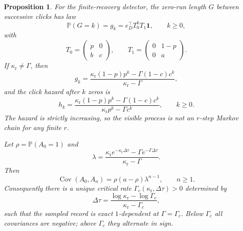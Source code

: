 \documentclass[11pt]{article}
\newtheorem{proposition}[theorem]{Proposition}
\theoremstyle{definition}
\newcommand{\PP}{\mathbb{P}}
\begin{document}
\begin{proposition}\label{prop:recovery-main}
For the finite-recovery detector, the zero-run length $G$ between successive clicks has law
\begin{equation}\label{eq:gap-main}
\PP(G=k)=g_k=e_D^{\top}T_0^kT_1\mathbf 1,
\qquad k\ge0,
\end{equation}
with
\begin{equation}\label{eq:t0-t1-main}
T_0=
\begin{pmatrix}
 p & 0 \\
 b & c
\end{pmatrix},
\qquad
T_1=
\begin{pmatrix}
 0 & 1-p \\
 0 & a
\end{pmatrix}.
\end{equation}
If $\kappa_{\mathrm r}\neq\Gamma$, then
\begin{equation}\label{eq:gap-closed-main}
g_k=
\frac{\kappa_{\mathrm r}(1-p)p^k-\Gamma(1-c)c^k}{\kappa_{\mathrm r}-\Gamma},
\end{equation}
and the click hazard after $k$ zeros is
\begin{equation}\label{eq:hazard-main}
h_k=
\frac{\kappa_{\mathrm r}(1-p)p^k-\Gamma(1-c)c^k}
     {\kappa_{\mathrm r}p^k-\Gamma c^k},
\qquad k\ge0.
\end{equation}
The hazard is strictly increasing, so the visible process is not an $r$-step Markov chain for any finite $r$.

Let $\rho=\PP(A_0=1)$ and
\begin{equation}\label{eq:lambda-main}
\lambda=
\frac{\kappa_{\mathrm r}e^{-\kappa_{\mathrm r}\Delta\tau}-\Gamma e^{-\Gamma\Delta\tau}}
{\kappa_{\mathrm r}-\Gamma}.
\end{equation}
Then
\begin{equation}\label{eq:cov-main}
\operatorname{Cov}(A_0,A_n)=\rho(a-\rho)\lambda^{n-1},\qquad n\ge1.
\end{equation}
Consequently there is a unique critical rate $\Gamma_c(\kappa_{\mathrm r},\Delta\tau)>0$ determined by
\begin{equation}\label{eq:gamma-c-main}
\Delta\tau=
\frac{\log\kappa_{\mathrm r}-\log\Gamma_c}{\kappa_{\mathrm r}-\Gamma_c},
\end{equation}
such that the sampled record is exact $1$-dependent at $\Gamma=\Gamma_c$. Below $\Gamma_c$ all covariances are negative; above $\Gamma_c$ they alternate in sign.
\end{proposition}
\end{document}

